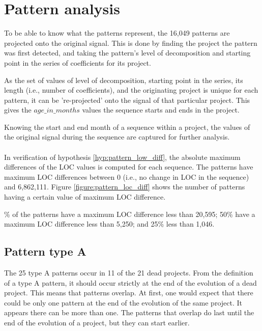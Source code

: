 \section{Pattern analysis}
\label{section:pattern_evaluation}
To be able to know what the patterns represent, the 16,049 patterns are
projected onto the original signal. This is done by finding the project the
pattern was first detected, and taking the pattern's level of decomposition and
starting point in the series of coefficients for its project.

As the set of values of level of decomposition, starting point in the series,
its length (i.e., number of coefficients), and the originating project is
unique for each pattern, it can be 're-projected' onto the signal of that
particular project. This gives the $age\_in\_months$ values the sequence starts
and ends in the project.

Knowing the start and end month of a sequence within a project, the values of
the original signal during the sequence are captured for further analysis.

\paragraph{}
In verification of hypothesis \ref{hyp:pattern_low_diff}, the absolute maximum
differences of the LOC values is computed for each sequence. The patterns have
maximum LOC differences between 0 (i.e., no change in LOC in the sequence) and
6,862,111. Figure \ref{figure:pattern_loc_diff} shows the number of patterns
having a certain value of maximum LOC difference.



\% of the patterns have a maximum LOC difference less than 20,595; 50\% have
a maximum LOC difference less than 5,250; and 25\% less than 1,046.

\subsection{Pattern type A}
The 25 type A patterns occur in 11 of the 21 dead projects. From the definition
of a type A pattern, it should occur strictly at the end of the evolution of a
dead project. This means that patterns overlap. At first, one would expect that
there could be only one pattern at the end of the evolution of the same
project. It appears there can be more than one. The patterns that overlap do
last until the end of the evolution of a project, but they can start earlier.

